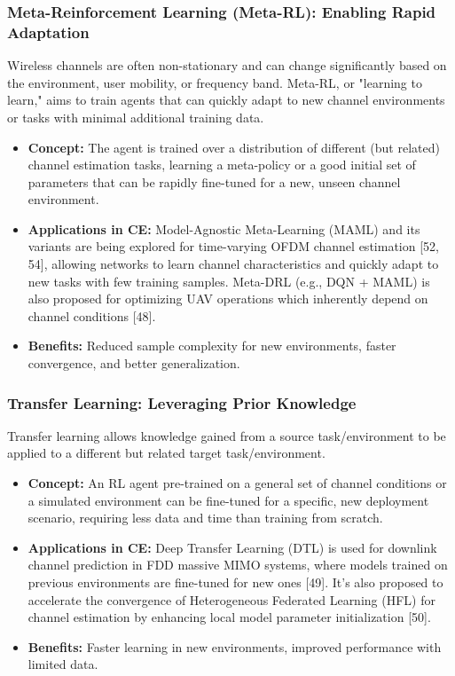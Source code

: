 \documentclass[journal,twocolumn]{IEEEtran}
\begin{document}
\subsubsection{Meta-Reinforcement Learning (Meta-RL): Enabling Rapid Adaptation}
Wireless channels are often non-stationary and can change significantly based on the environment, user mobility, or frequency band. Meta-RL, or "learning to learn," aims to train agents that can quickly adapt to new channel environments or tasks with minimal additional training data.
\begin{itemize}
    \item \textbf{Concept:} The agent is trained over a distribution of different (but related) channel estimation tasks, learning a meta-policy or a good initial set of parameters that can be rapidly fine-tuned for a new, unseen channel environment.
    \item \textbf{Applications in CE:} Model-Agnostic Meta-Learning (MAML) and its variants are being explored for time-varying OFDM channel estimation [52, 54], allowing networks to learn channel characteristics and quickly adapt to new tasks with few training samples. Meta-DRL (e.g., DQN + MAML) is also proposed for optimizing UAV operations which inherently depend on channel conditions [48].
    \item \textbf{Benefits:} Reduced sample complexity for new environments, faster convergence, and better generalization.
\end{itemize}

\subsubsection{Transfer Learning: Leveraging Prior Knowledge}
Transfer learning allows knowledge gained from a source task/environment to be applied to a different but related target task/environment.
\begin{itemize}
    \item \textbf{Concept:} An RL agent pre-trained on a general set of channel conditions or a simulated environment can be fine-tuned for a specific, new deployment scenario, requiring less data and time than training from scratch.
    \item \textbf{Applications in CE:} Deep Transfer Learning (DTL) is used for downlink channel prediction in FDD massive MIMO systems, where models trained on previous environments are fine-tuned for new ones [49]. It's also proposed to accelerate the convergence of Heterogeneous Federated Learning (HFL) for channel estimation by enhancing local model parameter initialization [50].
    \item \textbf{Benefits:} Faster learning in new environments, improved performance with limited data.
\end{itemize}
\end{document}
